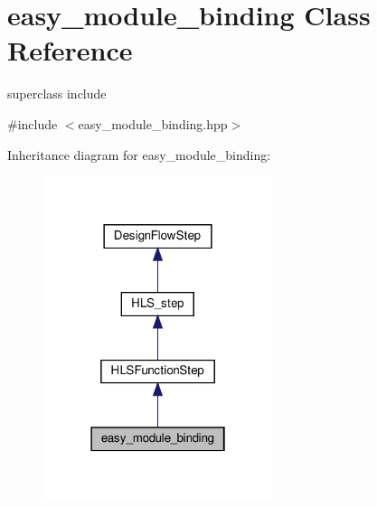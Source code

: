 \hypertarget{classeasy__module__binding}{}\section{easy\+\_\+module\+\_\+binding Class Reference}
\label{classeasy__module__binding}


superclass include  




{\ttfamily \#include $<$easy\+\_\+module\+\_\+binding.\+hpp$>$}



Inheritance diagram for easy\+\_\+module\+\_\+binding\+:
\nopagebreak
\begin{figure}[H]
\begin{center}
\leavevmode
\includegraphics[width=190pt]{de/dbb/classeasy__module__binding__inherit__graph}
\end{center}
\end{figure}


